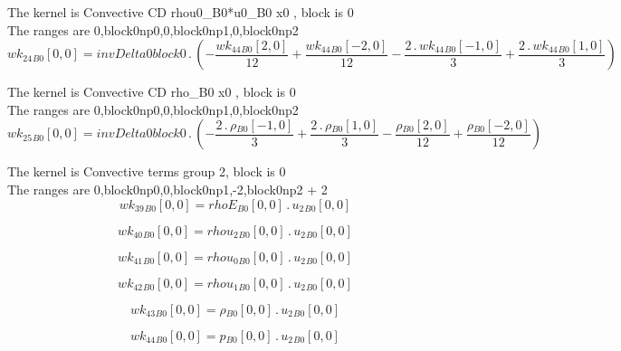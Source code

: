 \documentclass{article}
\begin{document}
\noindent The kernel is Convective CD rhou0_B0*u0_B0 x0 , block is 0\\\noindent The ranges are 0,block0np0,0,block0np1,0,block0np2\\\begin{dmath}{wk_{24}{_{B0}}}[{0,0}] = invDelta0block0 \,.\, \left(- \frac{{wk_{44}{_{B0}}}[{2,0}]}{12} + \frac{{wk_{44}{_{B0}}}[{-2,0}]}{12} - \frac{2 \,.\, {wk_{44}{_{B0}}}[{-1,0}]}{3} + \frac{2 \,.\, {wk_{44}{_{B0}}}[{1,0}]}{3}\right)\end{dmath}

\noindent The kernel is Convective CD rho_B0 x0 , block is 0\\\noindent The ranges are 0,block0np0,0,block0np1,0,block0np2\\\begin{dmath}{wk_{25}{_{B0}}}[{0,0}] = invDelta0block0 \,.\, \left(- \frac{2 \,.\, {\rho{_{B0}}}[{-1,0}]}{3} + \frac{2 \,.\, {\rho{_{B0}}}[{1,0}]}{3} - \frac{{\rho{_{B0}}}[{2,0}]}{12} + \frac{{\rho{_{B0}}}[{-2,0}]}{12}\right)\end{dmath}

\noindent The kernel is Convective terms group 2, block is 0\\\noindent The ranges are 0,block0np0,0,block0np1,-2,block0np2 + 2\\\begin{dmath}{wk_{39}{_{B0}}}[{0,0}] = {rhoE{_{B0}}}[{0,0}] \,.\, {u_{2}{_{B0}}}[{0,0}]\end{dmath}

\begin{dmath}{wk_{40}{_{B0}}}[{0,0}] = {rhou_{2}{_{B0}}}[{0,0}] \,.\, {u_{2}{_{B0}}}[{0,0}]\end{dmath}

\begin{dmath}{wk_{41}{_{B0}}}[{0,0}] = {rhou_{0}{_{B0}}}[{0,0}] \,.\, {u_{2}{_{B0}}}[{0,0}]\end{dmath}

\begin{dmath}{wk_{42}{_{B0}}}[{0,0}] = {rhou_{1}{_{B0}}}[{0,0}] \,.\, {u_{2}{_{B0}}}[{0,0}]\end{dmath}

\begin{dmath}{wk_{43}{_{B0}}}[{0,0}] = {\rho{_{B0}}}[{0,0}] \,.\, {u_{2}{_{B0}}}[{0,0}]\end{dmath}

\begin{dmath}{wk_{44}{_{B0}}}[{0,0}] = {p{_{B0}}}[{0,0}] \,.\, {u_{2}{_{B0}}}[{0,0}]\end{dmath}
\end{document}
